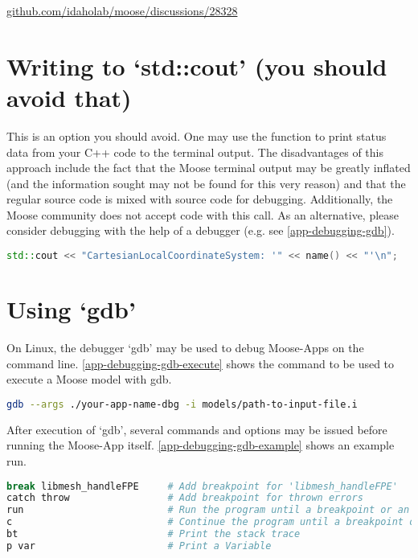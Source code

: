 \href{https://github.com/idaholab/moose/discussions/28328}{github.com/idaholab/moose/discussions/28328}

\section{Writing to ‘std::cout’ (you should avoid that)}

This is an option you should avoid. One may use the 
function to print status data from your C++ code to the terminal output. The
disadvantages of this approach include the fact that the Moose terminal output
may be greatly inflated (and the information sought may not be found for this
very reason) and that the regular source code is mixed with source code for
debugging. Additionally, the Moose community does not accept code with this
call. As an alternative, please consider debugging with the help of a debugger
(e.g. see \autoref{app-debugging-gdb}).

\begin{lstlisting}[language=C++, caption={Using ‘std::cout’ to print to the terminal (standard output)},label={app-debugging-cout}]
std::cout << "CartesianLocalCoordinateSystem: '" << name() << "'\n";
\end{lstlisting}

\section{Using ‘gdb’}
\label{app-debugging-gdb}

On Linux, the debugger ‘gdb’ may be used to debug Moose-Apps on the command
line. \autoref{app-debugging-gdb-execute} shows the command to be used to
execute a Moose model with gdb.

\begin{lstlisting}[language=bash, caption={Run gdb with a Moose model},label={app-debugging-gdb-execute}]
gdb --args ./your-app-name-dbg -i models/path-to-input-file.i
\end{lstlisting}

After execution of ‘gdb’, several commands and options may be issued before
running the Moose-App itself. \autoref{app-debugging-gdb-example} shows an
example run.

\begin{lstlisting}[language=bash, caption={Example run of gdb},label={app-debugging-gdb-example}]
break libmesh_handleFPE     # Add breakpoint for 'libmesh_handleFPE'
catch throw                 # Add breakpoint for thrown errors
run                         # Run the program until a breakpoint or an error
c                           # Continue the program until a breakpoint or an error
bt                          # Print the stack trace
p var                       # Print a Variable
\end{lstlisting}

